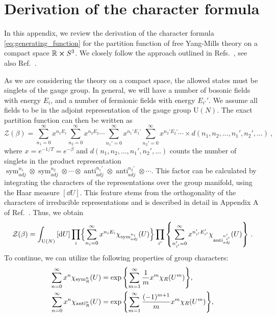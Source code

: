 \documentclass[a4paper,11pt]{article}
\DeclareMathOperator{\sym}{sym}
\DeclareMathOperator{\anti}{anti}
\begin{document}
\appendix
\section{Derivation of the character formula}
\label{app:deriv_character_formula}

In this appendix, we review the derivation of the character formula \eqref{eq:generating_function} for the partition function of free Yang-Mills theory on a compact space $\mathbb{R} \cross S^3$. We closely follow the approach outlined in Refs.\ \cite{Aharony:2003sx,Dutta:2007ws}, see also Ref.\ \cite{Skagerstam:1983gv}. 

As we are considering the theory on a compact space, the allowed states must be singlets of the gauge group. In general, we will have a number of bosonic fields with energy $E_i$, and a number of fermionic fields with energy $E_{i'}'$. We assume all fields to be in the adjoint representation of the gauge group $\text{U}(N)$. The exact partition function can then be written as
%
\begin{equation}
	\mathcal{Z}(\beta) = \sum_{n_1=0}^\infty x^{n_1E_1} \sum_{n_2=0}^\infty x^{n_2E_2} \dotsm \sum_{n_1'=0}^\infty x^{n_1'E_1'} \sum_{n_2'=0}^\infty x^{n_2'E_2'} \dotsm \times d(n_1,n_2,...,n_1',n_2',...) \ ,
\end{equation}
%
where $x=e^{-1/T}=e^{-\beta}$ and $d(n_1,n_2,...,n_1',n_2',...)$ counts the number of singlets in the product representation $\sym^{n_1}_{adj}\otimes \sym^{n_2}_{adj}\otimes \dotsm \otimes \anti^{n_1'}_{adj}\otimes \anti^{n_2'}_{adj}\otimes \dotsm $.
This factor can be calculated by integrating the characters of the representations over the group manifold, using the Haar measure $[\dd U]$. This feature stems from the orthogonality of the characters of irreducible representations and is described in detail in Appendix A of Ref.\ \cite{Aharony:2003sx}.
Thus, we obtain
%
\begin{equation}
	\mathcal{Z}(\beta) = \int_{\text{U}(N)}\left[ \dd U\right] \prod_i \Bigl\{ \sum_{n_i=0}^\infty x^{n_iE_i} \chi_{\sym^{n_i}_{adj}}(U) \Bigr\}   \prod_{i'} \qty{ \sum_{n'_{i'}=0}^\infty x^{n'_{i'}E'_{i'}} \chi_{\anti^{n'_{i'}}_{adj}}(U) } \ .
\end{equation}
To continue, we can utilize the following properties of group characters:
%
\begin{equation}
\begin{split}
	\sum_{n=0}^\infty x^n \chi_{\sym^n_R}(U) &= \exp\qty{\sum_{m=1}^\infty \frac{1}{m} x^m \chi_R (U^m) }  , \\
	\sum_{n=0}^\infty x^n \chi_{\anti^n_R}(U) &= \exp\qty{\sum_{m=1}^\infty \frac{(-1)^{m+1}}{m} x^m \chi_R (U^m) }  ,
\end{split}
\end{equation}
\end{document}
